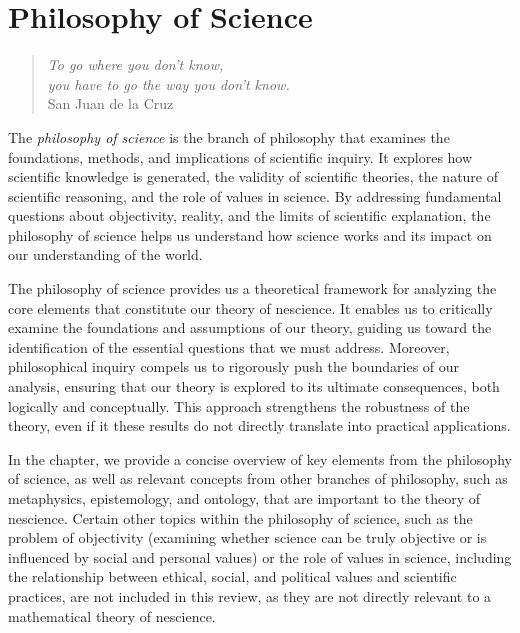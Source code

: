 %
%


\chapter{Philosophy of Science}
\label{chap:Philosophy}

\begin{quote}
\begin{flushright}
\emph{To go where you don't know, \\
you have to go the way you don't know.} \\
San Juan de la Cruz 
\end{flushright}
\end{quote}
\bigskip

The \emph{philosophy of science} is the branch of philosophy that examines the foundations, methods, and implications of scientific inquiry. It explores how scientific knowledge is generated, the validity of scientific theories, the nature of scientific reasoning, and the role of values in science. By addressing fundamental questions about objectivity, reality, and the limits of scientific explanation, the philosophy of science helps us understand how science works and its impact on our understanding of the world.

The philosophy of science provides us a theoretical framework for analyzing the core elements that constitute our theory of nescience. It enables us to critically examine the foundations and assumptions of our theory, guiding us toward the identification of the essential questions that we must address. Moreover, philosophical inquiry compels us to rigorously push the boundaries of our analysis, ensuring that our theory is explored to its ultimate consequences, both logically and conceptually. This approach strengthens the robustness of the theory, even if it these results do not directly translate into practical applications.

In the chapter, we provide a concise overview of key elements from the philosophy of science, as well as relevant concepts from other branches of philosophy, such as metaphysics, epistemology, and ontology, that are important to the theory of nescience. Certain other topics within the philosophy of science, such as the problem of objectivity (examining whether science can be truly objective or is influenced by social and personal values) or the role of values in science, including the relationship between ethical, social, and political values and scientific practices, are not included in this review, as they are not directly relevant to a mathematical theory of nescience.

